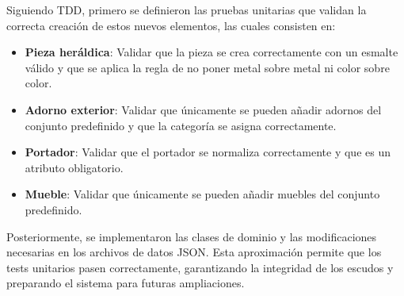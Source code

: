 Siguiendo TDD, primero se definieron las pruebas unitarias que validan la correcta creación de estos 
nuevos elementos, las cuales consisten en:

\begin{itemize}
    \item \textbf{Pieza heráldica}: Validar que la pieza se crea correctamente con un esmalte válido y que
    se aplica la regla de no poner metal sobre metal ni color sobre color.
    \item \textbf{Adorno exterior}: Validar que únicamente se pueden añadir adornos del conjunto predefinido
    y que la categoría se asigna correctamente.
    \item \textbf{Portador}: Validar que el portador se normaliza correctamente y que es un atributo obligatorio.
    \item \textbf{Mueble}: Validar que únicamente se pueden añadir muebles del conjunto predefinido.
\end{itemize}

Posteriormente, se implementaron las clases de dominio y las modificaciones necesarias en los archivos 
de datos JSON. Esta aproximación permite que los tests unitarios pasen correctamente, garantizando la 
integridad de los escudos y preparando el sistema para futuras ampliaciones.